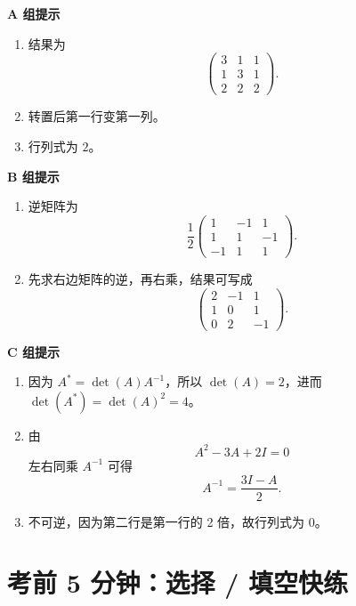 \documentclass[11pt,oneside,UTF8]{ctexbook}
\begin{document}
\begin{summarybox}[答案提示]
\textbf{A 组提示}
\begin{enumerate}[label=\textbf{A\arabic*.}]
  \item 结果为
  \[
  \begin{pmatrix}
  3&1&1\\
  1&3&1\\
  2&2&2
  \end{pmatrix}.
  \]
  \item 转置后第一行变第一列。
  \item 行列式为 \(2\)。
\end{enumerate}

\textbf{B 组提示}
\begin{enumerate}[label=\textbf{B\arabic*.}]
  \item 逆矩阵为
  \[
  \frac12\begin{pmatrix}
  1&-1&1\\
  1&1&-1\\
  -1&1&1
  \end{pmatrix}.
  \]
  \item 先求右边矩阵的逆，再右乘，结果可写成
  \[
  \begin{pmatrix}
  2&-1&1\\
  1&0&1\\
  0&2&-1
  \end{pmatrix}.
  \]
\end{enumerate}

\textbf{C 组提示}
\begin{enumerate}[label=\textbf{C\arabic*.}]
  \item 因为 \(A^*=\det(A)A^{-1}\)，所以 \(\det(A)=2\)，进而 \(\det(A^*)=\det(A)^{2}=4\)。
  \item 由
  \[
  A^2-3A+2I=0
  \]
  左右同乘 \(A^{-1}\) 可得
  \[
  A^{-1}=\frac{3I-A}{2}.
  \]
  \item 不可逆，因为第二行是第一行的 2 倍，故行列式为 \(0\)。
\end{enumerate}
\end{summarybox}

\section{考前 5 分钟：选择 / 填空快练}
\end{document}
